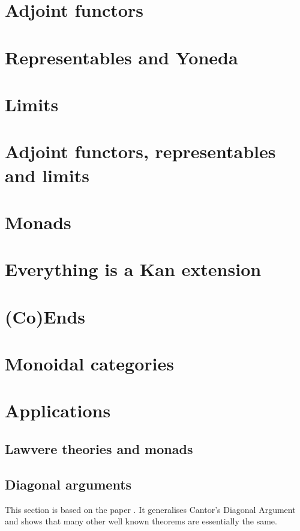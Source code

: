 \documentclass[12pt]{report}
\theoremstyle{definition}
\begin{document}
\section{Adjoint functors}

\section{Representables and Yoneda}

\section{Limits}

\section{Adjoint functors, representables and limits}

\section{Monads}

\section{Everything is a Kan extension}

\section{(Co)Ends}

\section{Monoidal categories}

\section{Applications}

\subsection{Lawvere theories and monads}

\subsection{Diagonal arguments}\label{sec:category-theory:diagonal-arguments}
This section is based on the paper \cite{lawvere:diagonal_arguments_and_cartesian_closed_categories}. It generalises Cantor's Diagonal Argument and shows that many other well known theorems are essentially the same.
\end{document}
